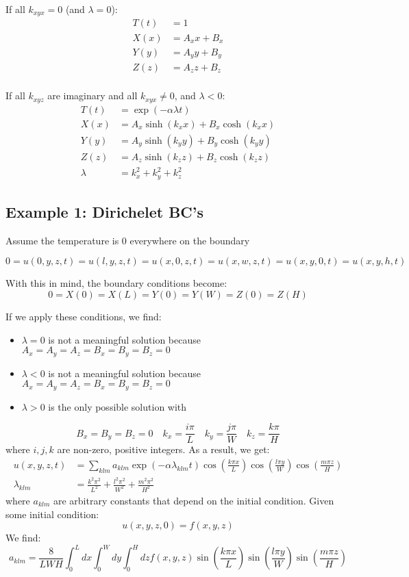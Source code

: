 \documentclass{article}
\begin{document}
If all $k_{xyx} = 0$ (and $\lambda = 0$):
\begin{align*}
  T(t) &= 1 \\
  X(x) &= A_x x + B_x \\
  Y(y) &= A_y y + B_y \\
  Z(z) &= A_z z + B_z \\
\end{align*}

If all $k_{xyz}$ are imaginary and all $k_{xyx} \neq 0$, and $\lambda < 0$:
\begin{align*}
  T(t) &= \exp\left(-\alpha \lambda t\right) \\
  X(x) &= A_x \sinh\left(k_x x\right) + B_x \cosh\left(k_x x\right) \\
  Y(y) &= A_y \sinh\left(k_y y\right) + B_y \cosh\left(k_y y\right) \\
  Z(z) &= A_z \sinh\left(k_z z\right) + B_z \cosh\left(k_z z\right) \\
  \lambda &= k_x^2 + k_y^2 + k_z^2
\end{align*}




\subsection{Example 1: Dirichelet BC's}
Assume the temperature is 0 everywhere on the boundary

$$
0 = u(0,y,z,t) = u(l,y,z,t) = u(x,0,z,t) = u(x,w,z,t) = u(x,y,0,t) = u(x,y,h,t)
$$

With this in mind, the boundary conditions become:
\[
  0 = X(0) = X(L) = Y(0) = Y(W) = Z(0) = Z(H)
\]

If we apply these conditions, we find:
\begin{itemize}
  \item $\lambda = 0$ is not a meaningful solution because $A_x=A_y=A_z=B_x=B_y=B_z=0$
  \item $\lambda < 0$ is not a meaningful solution because $A_x=A_y=A_z=B_x=B_y=B_z=0$
  \item $\lambda > 0$ is the only possible solution with
\end{itemize}
\[
  B_x = B_y = B_z = 0 \quad k_x=\frac{i\pi}{L} \quad k_y = \frac{j\pi}{W} \quad k_z =
  \frac{k\pi}{H}
\]
where $i,j,k$ are non-zero, positive integers. As a result, we get:
\begin{align*}
  u(x,y,z,t) &= \sum_{klm} a_{klm}\exp\left(-\alpha\lambda_{klm}t\right)
               \cos\left(\frac{k\pi x}{L}\right) \cos\left(\frac{l\pi y}{W}\right)
               \cos\left(\frac{m\pi z}{H}\right) \\
  \lambda_{klm} &= \frac{k^2\pi^2}{L^2} + \frac{l^2\pi^2}{W^2} + \frac{m^2\pi^2}{H^2}
\end{align*}
where $a_{klm}$ are arbitrary constants that depend on the initial condition. Given some
initial condition:
\[
  u(x,y,z,0) = f(x,y,z)
\]
We find:
\[
  a_{klm} = \frac{8}{LWH}\int_0^L dx \int_0^W dy \int_0^H dz f(x,y,z) \sin\left(\frac{k\pi
      x}{L}\right) \sin\left(\frac{l\pi y}{W}\right) \sin\left(\frac{m\pi z}{H}\right)
\]
\end{document}
